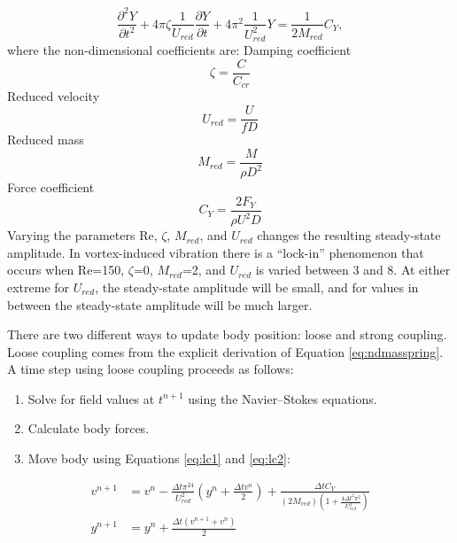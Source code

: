 \documentclass[preprint,12pt]{elsarticle}
\begin{document}
\begin{equation}
\frac{\partial^2 Y}{\partial t^2}+4\pi \zeta\frac{1}{U_{red}}\frac{\partial Y}{\partial t}+4\pi^2\frac{1}{U_{red}^2}Y=\frac{1}{2M_{red}}C_Y,\label{eq:ndmasspring}
\end{equation}
where the non-dimensional coefficients are:\newline
Damping coefficient
\begin{equation}
\zeta=\frac{C}{C_{cr}}\label{eq:damping coefficient}
\end{equation}
Reduced velocity
\begin{equation}
U_{red}=\frac{U}{fD}\label{eq:reduced velocity}
\end{equation}
Reduced mass
\begin{equation}
M_{red}=\frac{M}{\rho D^2}\label{eq:reduced mass}
\end{equation}
Force coefficient
\begin{equation}
C_Y=\frac{2F_Y}{\rho U^2 D}\label{eq:force coefficient}
\end{equation}
Varying the parameters Re, $\zeta$, $M_{red}$, and $U_{red}$ changes the resulting steady-state amplitude. 
In vortex-induced vibration there is a ``lock-in'' phenomenon that occurs when Re=150, $\zeta$=0, $M_{red}$=2, and $U_{red}$ is varied between 3 and 8. 
At either extreme for $U_{red}$, the steady-state amplitude will be small, and for values in between the steady-state amplitude will be much larger. 

There are two different ways to update body position: loose and strong coupling. 
Loose coupling comes from the explicit derivation of Equation \eqref{eq:ndmasspring}.
A time step using loose coupling proceeds as follows:
\begin{enumerate}
	\item Solve for field values at $t^{n+1}$ using the Navier--Stokes equations.
	\item Calculate body forces.
	\item Move body using Equations \eqref{eq:lc1} and \eqref{eq:lc2}:
\end{enumerate}
\begin{align}
v^{n+1} &= v^n-\frac{\Delta t\pi^24}{U_{red}^2}\left(y^n+\frac{\Delta tv^n}{2}\right) + \frac{\Delta tC_Y}{\left(2M_{red}\right)\left(1+\frac{4\Delta t^2\pi^2}{U_{red}^2}\right)} \label{eq:lc1} \\
y^{n+1} &= y^n +\frac{\Delta t\left(v^{n+1}+v^n\right)}{2}\; \label{eq:lc2}
\end{align}
\end{document}
